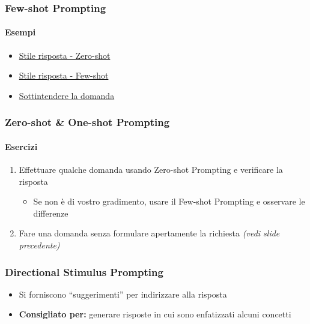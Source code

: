 \begin{exampleframe}
    \frametitle{Few-shot Prompting}
    \framesubtitle{Esempi}

    \begin{itemize}
        \item \href{https://chatgpt.com/share/67616888-2a94-8003-a6ff-d4654de2d19f}{Stile risposta - Zero-shot}
        \item \href{https://chatgpt.com/share/67617a94-bb78-8003-80e0-82d15c99033c}{Stile risposta - Few-shot}

        \bigskip
        \item \href{https://chatgpt.com/share/67852600-5a7c-8003-8e17-f9f33d8c9b18}{Sottintendere la domanda}
    \end{itemize}
\end{exampleframe}

\begin{exerciseframe}
    \frametitle{Zero-shot \& One-shot Prompting}
    \framesubtitle{Esercizi}

    \begin{enumerate}
        \item Effettuare qualche domanda usando Zero-shot Prompting e verificare la risposta
        \begin{itemize}
            \item Se non è di vostro gradimento, usare il Few-shot Prompting e osservare le differenze
        \end{itemize}

        \bigskip
        \item Fare una domanda senza formulare apertamente la richiesta \textit{(vedi slide precedente)}
    \end{enumerate}
\end{exerciseframe}



\begin{contentframe}
    \frametitle{Directional Stimulus Prompting}

    \begin{itemize}
        \item Si forniscono ``suggerimenti'' per indirizzare alla risposta

        \bigskip
        \item \textbf{Consigliato per:} generare risposte in cui sono enfatizzati alcuni concetti
    \end{itemize}
\end{contentframe}

